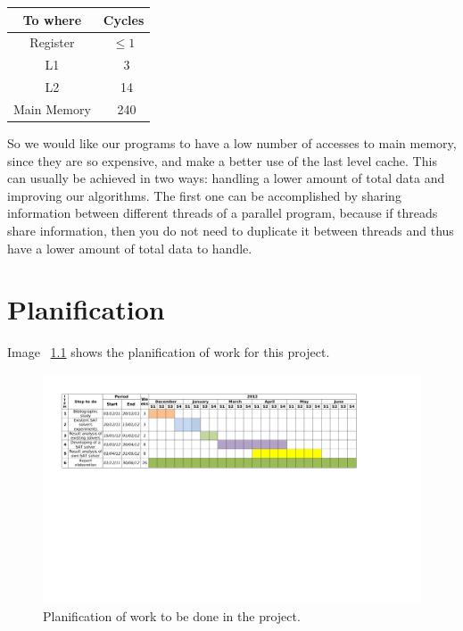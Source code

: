 \documentclass[12pt]{diicc}
\begin{document}
\begin{center}
\begin{tabular}{ c | c }
  To where & Cycles \\ \hline
  Register & $\leq 1$ \\
  L1 & ~3 \\ 
  L2 & ~14 \\
  Main Memory & ~240 \\
\end{tabular}
\end{center}

So we would like our programs to have a low number of accesses to main memory, since they are so expensive, and make a better use of the last level cache. This can usually be achieved in two ways: handling a lower amount of total data and improving our algorithms. The first one can be accomplished by sharing information between different threads of a parallel program, because if threads share information, then you do not need to duplicate it between threads and thus have a lower amount of total data to handle.


% 
\chapter{Planification}\label{chap:planification}

Image ~\ref{fig:plan} shows the planification of work for this project.

\begin{figure}[h!]
  \centering
    \includegraphics[angle=90, scale=0.6]{plan}
  \caption{Planification of work to be done in the project.}
  \label{fig:plan}
\end{figure}
\end{document}
